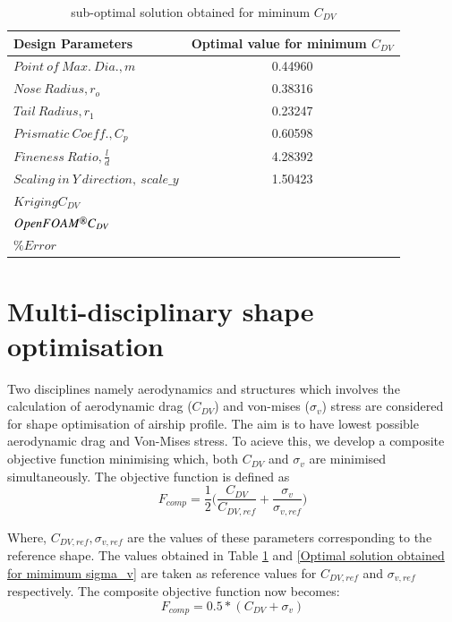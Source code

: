 \begin{table}[H]
	\centering
	\caption{sub-optimal solution obtained for miminum $ C_{DV} $}
	\label{sub-optimal solution obtained}
	\begin{tabular}{lc}
		\hline \hline
		Design Parameters & Optimal value for minimum $ C_{DV} $    \\ \hline \hline
		
		$ Point\ of\ Max.\ Dia., m$ & 0.44960      \\  
		$ Nose\ Radius, r _{o} $ & 0.38316    \\
		$ Tail\ Radius, r _{1} $ & 0.23247     \\  
		$ Prismatic\ Coeff., C _{p }$ & 0.60598 \\
		$ Fineness\ Ratio, \frac{l}{d} $ &4.28392 \\
		$Scaling\ in\ Y\ direction,\ scale\_y$ &1.50423 \\ \hline \hline
		
		$ Kriging C_{DV} $ & \\
		$ OpenFOAM\textsuperscript{\textregistered} C_{DV} $ & \\
		$ \% Error $ & \\
		\hline \hline
	\end{tabular}
\end{table}

\section{Multi-disciplinary shape optimisation}
Two disciplines namely aerodynamics and structures which involves the calculation of aerodynamic drag ($ C_{DV} $) and von-mises ($ \sigma _{v} $) stress are considered for shape optimisation of airship profile. The aim is to have lowest possible aerodynamic drag and Von-Mises stress. To acieve this, we develop a composite objective function minimising which, both $ C_{DV} $ and $ \sigma _{v} $ are minimised simultaneously.
The objective function is defined as
\begin{equation}
F_{comp} = \frac{1}{2}\bigg( \frac{C_{DV}}{C_{DV,ref}} + \dfrac{\sigma _{v}}{\sigma _{v,ref}} \bigg)
\end{equation}

Where, $C_{DV,ref} , \sigma _{v,ref}  $ are the values of these parameters corresponding to the reference shape.  The values obtained in Table \ref{sub-optimal solution obtained} and \ref{Optimal solution obtained for mimimum sigma_v} are taken as reference values for $C_{DV,ref}$ and $\sigma _{v,ref}  $ respectively. The composite objective function now becomes:
\begin{equation}
F_{comp} = 0.5*( C_{DV} + \sigma _{v})
\end{equation}
